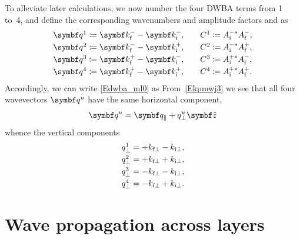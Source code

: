 To alleviate later calculations,
we now number the four DWBA terms from 1 to~4,
and define the corresponding wavenumbers and amplitude factors and as
\begin{equation}
  \begin{array}{l@{\hspace{2em}}l}
    \q^1 \coloneqq  \k^-_\tf - \k^-_\ti,& C^1 \coloneqq  A^{-*}_\ti A^-_\tf, \\[.6ex]
    \q^2 \coloneqq  \k^-_\tf - \k^+_\ti,& C^2 \coloneqq  A^{-*}_\ti A^+_\tf, \\[.6ex]
    \q^3 \coloneqq  \k^+_\tf - \k^-_\ti,& C^3 \coloneqq  A^{+*}_\ti A^-_\tf, \\[.6ex]
    \q^4 \coloneqq  \k^+_\tf - \k^+_\ti,& C^4 \coloneqq  A^{+*}_\ti A^+_\tf.
  \end{array}
\end{equation}
Accordingly, we can write \cref{Edwba_ml0} as
From~\cref{Ekpmwj3} we see that all four wavevectors $\q^u$
have the same horizontal component,
\begin{equation}\label{Eqpp}
  \q^u = \q_\plll + q^u_\perp \v{\hat z}
\end{equation}
whence the vertical components
\begin{equation}
    \begin{array}{l}
  q^1_\perp = +k_{\text{f}\perp  } -k_{\text{i}\perp},\\[.6ex]
  q^2_\perp = +k_{\text{f}\perp  } +k_{\text{i}\perp},\\[.6ex]
  q^3_\perp = -k_{\text{f}\perp  } -k_{\text{i}\perp},\\[.6ex]
  q^4_\perp = -k_{\text{f}\perp  } +k_{\text{i}\perp}.
    \end{array}
\end{equation}

\section{Wave propagation across layers}\label{Sacrolay}

%
%
%

